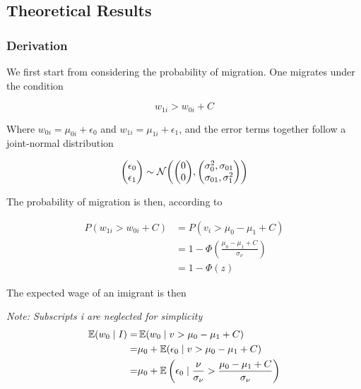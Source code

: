 \subsection{Theoretical Results}

\subsubsection{Derivation}

We first start from considering the probability of migration. 
One migrates under the condition

\begin{equation}
    w_{1i} > w_{0i} + C
\end{equation}

Where $w_{0i} = \mu_{0i} + \epsilon_0$ and $w_{1i} = \mu_{1i} + \epsilon_1$, 
and the error terms together follow a joint-normal distribution

\begin{equation}
    \label{eq:def_w}
    \mqty(\epsilon_0 \\ \epsilon_1) 
    \sim
    \mathcal{N} \qty(
        \mqty(0 \\ 0),
        \mqty(\sigma_0^2, \sigma_{01} \\
              \sigma_{01}, \sigma_1^2)
    )
\end{equation}

The probability of migration is then, according to 

\begin{align}
    P(w_{1i} > w_{0i} + C) &= P(v_i > \mu_0 - \mu_1 + C) \nonumber \\
    &=1 - \Phi(\frac{\mu_0 - \mu_1 + C}{\sigma_\nu}) \nonumber \\
    &=1 - \Phi(z) \nonumber
\end{align}

The expected wage of an imigrant is then

\newcommand{\given}{\mid}

\emph{Note: Subscripts i are neglected for simplicity}
\begin{align*}
    \E(w_{0} \given I) =& \E(w_{0} \given v > \mu_0 - \mu_1 + C)  \\
    =& \mu_0 + \E(\epsilon_0 \given  v > \mu_0 - \mu_1 + C )  \\
    =& \mu_0 + \E \left(
            \epsilon_0 \given \frac{\nu}{\sigma_\nu} > \frac{\mu_0 - \mu_1 + C}{\sigma_\nu}
            \right)
\end{align*}

